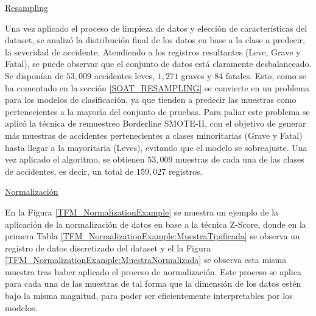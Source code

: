 \documentclass{uathesis-es}
\begin{document}
{	%
	
	
	\underline{Resampling}
	
	Una vez aplicado el proceso de limpieza de datos y elección de características del dataset, se analizó la distribución final de los datos en base a la clase a predecir, la severidad de accidente. Atendiendo a los registros resultantes (Leve, Grave y Fatal), se puede observar que el conjunto de datos está claramente desbalanceado. Se disponían de $53,009$ accidentes leves, $1,271$ graves y $84$ fatales. Esto, como se ha comentado en la sección \ref{SOAT_RESAMPLING} se convierte en un problema para los modelos de clasificación, ya que tienden a predecir las muestras como pertenecientes a la mayoría del conjunto de pruebas. Para paliar este problema se aplicó la técnica de remuestreo Borderline SMOTE-II, con el objetivo de generar más muestras de accidentes pertenecientes a clases minoritarias (Grave y Fatal) hasta llegar a la mayoritaria (Leves), evitando que el modelo se sobreajuste. Una vez aplicado el algoritmo, se obtienen $53,009$ muestras de cada una de las clases de accidentes, es decir, un total de $159,027$ registros.
	
	
	\underline{Normalización}
	
	En la Figura \ref{TFM_NormalizationExample} se muestra un ejemplo de la aplicación de la normalización de datos en base a la técnica Z-Score, donde en la primera Tabla \ref{TFM_NormalizationExample:MuestraTipificada} se observa un registro de datos discretizado del dataset y el la Figura \ref{TFM_NormalizationExample:MuestraNormalizada} se observa esta misma muestra tras haber aplicado el proceso de normalización. Este proceso se aplica para cada una de las muestras de tal forma que la dimensión de los datos estén bajo la misma magnitud, para poder ser eficientemente interpretables por los modelos.
	
	
	\begin{figure}[H]
		\scriptsize
		\centering
		\renewcommand{\arraystretch}{1.4}
		
		\captionsetup{singlelinecheck = false, format= hang, justification=raggedright, font=footnotesize, labelsep=space}
		
		\begin{c}
			\centering
			
			\captionsetup{singlelinecheck = false, format= hang, justification=centering, font=footnotesize, labelsep=space}
			

\end{c}
\end{figure}}
\end{document}

